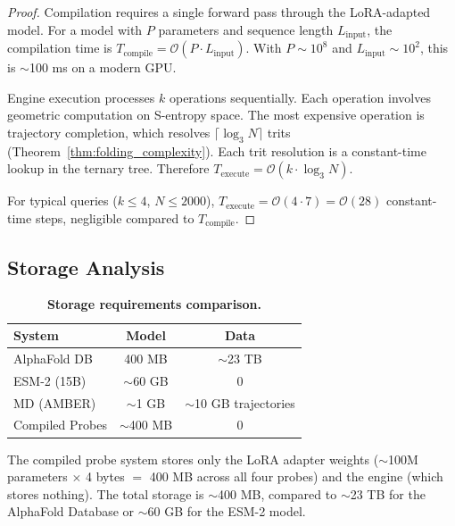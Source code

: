 \documentclass[11pt,twocolumn,a4paper]{article}
\theoremstyle{definition}
\theoremstyle{remark}
\begin{document}
\begin{proof}
Compilation requires a single forward pass through the LoRA-adapted model. For a model with $P$ parameters and sequence length $L_{\text{input}}$, the compilation time is $T_{\text{compile}} = \mathcal{O}(P \cdot L_{\text{input}})$. With $P \sim 10^8$ and $L_{\text{input}} \sim 10^2$, this is $\sim$100 ms on a modern GPU.

Engine execution processes $k$ operations sequentially. Each operation involves geometric computation on S-entropy space. The most expensive operation is trajectory completion, which resolves $\lceil \log_3 N \rceil$ trits (Theorem~\ref{thm:folding_complexity}). Each trit resolution is a constant-time lookup in the ternary tree. Therefore $T_{\text{execute}} = \mathcal{O}(k \cdot \log_3 N)$.

For typical queries ($k \leq 4$, $N \leq 2000$), $T_{\text{execute}} = \mathcal{O}(4 \cdot 7) = \mathcal{O}(28)$ constant-time steps, negligible compared to $T_{\text{compile}}$.
\end{proof}

\subsection{Storage Analysis}

\begin{table}[H]
\centering
\caption{\textbf{Storage requirements comparison.}}
\label{tab:storage}
\begin{tabular}{@{}lcc@{}}
\toprule
\textbf{System} & \textbf{Model} & \textbf{Data} \\
\midrule
AlphaFold DB & 400 MB & $\sim$23 TB \\
ESM-2 (15B) & $\sim$60 GB & 0 \\
MD (AMBER) & $\sim$1 GB & $\sim$10 GB trajectories \\
Compiled Probes & $\sim$400 MB & 0 \\
\bottomrule
\end{tabular}
\end{table}

The compiled probe system stores only the LoRA adapter weights ($\sim$100M parameters $\times$ 4 bytes $=$ 400 MB across all four probes) and the engine (which stores nothing). The total storage is $\sim$400 MB, compared to $\sim$23 TB for the AlphaFold Database or $\sim$60 GB for the ESM-2 model.
\end{document}
